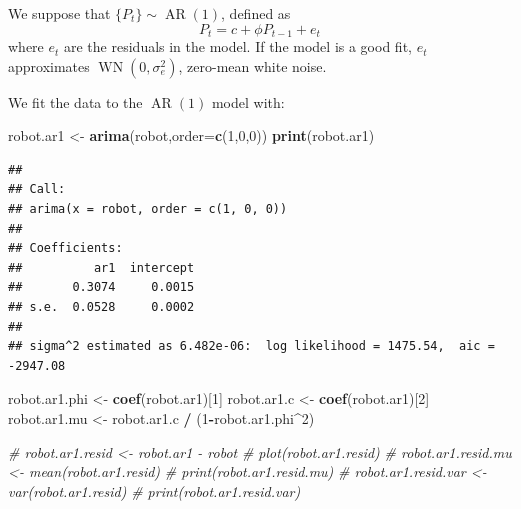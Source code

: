\documentclass[
]{article}
\newenvironment{Shaded}{\begin{snugshade}}{\end{snugshade}}
\newcommand{\AttributeTok}[1]{\textcolor[rgb]{0.13,0.29,0.53}{#1}}
\newcommand{\CommentTok}[1]{\textcolor[rgb]{0.56,0.35,0.01}{\textit{#1}}}
\newcommand{\DecValTok}[1]{\textcolor[rgb]{0.00,0.00,0.81}{#1}}
\newcommand{\FunctionTok}[1]{\textcolor[rgb]{0.13,0.29,0.53}{\textbf{#1}}}
\newcommand{\NormalTok}[1]{#1}
\newcommand{\OtherTok}[1]{\textcolor[rgb]{0.56,0.35,0.01}{#1}}
\newcommand{\SpecialCharTok}[1]{\textcolor[rgb]{0.81,0.36,0.00}{\textbf{#1}}}
\begin{document}

We suppose that \(\{P_t\} \sim \operatorname{AR}(1)\), defined as \[
   P_t = c + \phi P_{t-1} + e_t
\] where \(e_t\) are the residuals in the model. If the model is a good
fit, \(e_t\) approximates \(\operatorname{WN}(0,\sigma_e^2)\), zero-mean
white noise.

We fit the data to the \(\operatorname{AR}(1)\) model with:

\begin{Shaded}
\begin{Highlighting}[]
\NormalTok{robot.ar1 }\OtherTok{\textless{}{-}} \FunctionTok{arima}\NormalTok{(robot,}\AttributeTok{order=}\FunctionTok{c}\NormalTok{(}\DecValTok{1}\NormalTok{,}\DecValTok{0}\NormalTok{,}\DecValTok{0}\NormalTok{))}
\FunctionTok{print}\NormalTok{(robot.ar1)}
\end{Highlighting}
\end{Shaded}

\begin{verbatim}
## 
## Call:
## arima(x = robot, order = c(1, 0, 0))
## 
## Coefficients:
##          ar1  intercept
##       0.3074     0.0015
## s.e.  0.0528     0.0002
## 
## sigma^2 estimated as 6.482e-06:  log likelihood = 1475.54,  aic = -2947.08
\end{verbatim}

\begin{Shaded}
\begin{Highlighting}[]
\NormalTok{robot.ar1.phi }\OtherTok{\textless{}{-}} \FunctionTok{coef}\NormalTok{(robot.ar1)[}\DecValTok{1}\NormalTok{]}
\NormalTok{robot.ar1.c }\OtherTok{\textless{}{-}} \FunctionTok{coef}\NormalTok{(robot.ar1)[}\DecValTok{2}\NormalTok{]}
\NormalTok{robot.ar1.mu }\OtherTok{\textless{}{-}}\NormalTok{ robot.ar1.c }\SpecialCharTok{/}\NormalTok{ (}\DecValTok{1}\SpecialCharTok{{-}}\NormalTok{robot.ar1.phi}\SpecialCharTok{\^{}}\DecValTok{2}\NormalTok{)}

\CommentTok{\# robot.ar1.resid \textless{}{-} robot.ar1 {-} robot}
\CommentTok{\# plot(robot.ar1.resid)}
\CommentTok{\# robot.ar1.resid.mu \textless{}{-} mean(robot.ar1.resid)}
\CommentTok{\# print(robot.ar1.resid.mu)}
\CommentTok{\# robot.ar1.resid.var \textless{}{-} var(robot.ar1.resid)}
\CommentTok{\# print(robot.ar1.resid.var)}
\end{Highlighting}
\end{Shaded}
\end{document}

